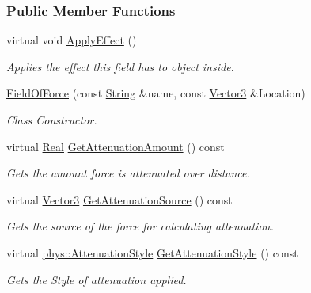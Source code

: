 \subsubsection*{Public Member Functions}
\begin{DoxyCompactItemize}
\item 
virtual void \hyperlink{classphys_1_1FieldOfForce_a625da808c9e77eafa47553854dc61c0c}{ApplyEffect} ()
\begin{DoxyCompactList}\small\item\em Applies the effect this field has to object inside. \item\end{DoxyCompactList}\item 
\hyperlink{classphys_1_1FieldOfForce_a0e9496af8a6c8cb0d79ebe40bbe223f2}{FieldOfForce} (const \hyperlink{namespacephys_aa03900411993de7fbfec4789bc1d392e}{String} \&name, const \hyperlink{classphys_1_1Vector3}{Vector3} \&Location)
\begin{DoxyCompactList}\small\item\em Class Constructor. \item\end{DoxyCompactList}\item 
virtual \hyperlink{namespacephys_af7eb897198d265b8e868f45240230d5f}{Real} \hyperlink{classphys_1_1FieldOfForce_a172a581eb1db6269e62764389fbde98c}{GetAttenuationAmount} () const 
\begin{DoxyCompactList}\small\item\em Gets the amount force is attenuated over distance. \item\end{DoxyCompactList}\item 
virtual \hyperlink{classphys_1_1Vector3}{Vector3} \hyperlink{classphys_1_1FieldOfForce_a254e3ec97983aeeb9f3af7a656c9e7c5}{GetAttenuationSource} () const 
\begin{DoxyCompactList}\small\item\em Gets the source of the force for calculating attenuation. \item\end{DoxyCompactList}\item 
virtual \hyperlink{namespacephys_ad4ce7ee5c1cc164f2ea3d5f28211739f}{phys::AttenuationStyle} \hyperlink{classphys_1_1FieldOfForce_adebea1a14be7602fe358586890372211}{GetAttenuationStyle} () const 
\begin{DoxyCompactList}\small\item\em Gets the Style of attenuation applied. \item\end{DoxyCompactList}\item 

\end{DoxyCompactItemize}

